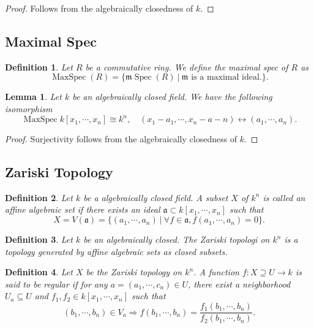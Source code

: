 \documentclass{article}
\newtheorem{definition}{Definition}[section]
\newtheorem{lemma}{Lemma}[section]
\numberwithin{equation}{section}
\DeclareMathOperator{\Spec}{Spec}
\DeclareMathOperator{\MaxSpec}{MaxSpec}
\begin{document}
\begin{proof}
Follows from the algebraically closedness of $k$.%
\end{proof}


\subsection{Maximal Spec}

\begin{definition}
Let $R$ be a commutative ring. We define the maximal spec of $R$ as 
\begin{equation*}
\MaxSpec(R) = \{\mathfrak{m}\Spec(R)\:|\: \mathfrak{m}\text{ is a maximal ideal}.\}.
\end{equation*}
\end{definition}

\begin{lemma}
Let $k$ be an algebraically closed field. We have the following isomorphism
\begin{equation*}
\MaxSpec{k[x_1,\cdots,x_n]}\cong k^n,\quad (x_1-a_1,\cdots,x_n-a-n)\leftrightarrow (a_1,\cdots,a_n).
\end{equation*}
\end{lemma}

\begin{proof}
Surjectivity follows from the algebraically closedness of $k$. %
\end{proof}

\subsection{Zariski Topology}

\begin{definition}
Let $k$ be a algebraically closed field. A subset $X$ of $k^n$ is called an affine algebraic set if there exists an ideal $\mathfrak{a}\subset k[x_1,\cdots,x_n]$ such that
\begin{equation*}
X=V(\mathfrak{a}) = \{(a_1,\cdots,a_n)\:|\: \forall f\in\mathfrak{a}, f(a_1,\cdots,a_n)=0\}.
\end{equation*}
\end{definition}

\begin{definition}
Let $k$ be an algebraically closed. The Zariski topologi on $k^n$ is a topology generated by affine algebraic sets as closed subsets. 
\end{definition}

\begin{definition}
Let $X$ be the Zariski topology on $k^n$. A function $f:X\supseteq U\to k$ is said to be regular if for any $a=(a_1,\cdots,c_n)\in U$, there exist a neighborhood $U_a\subseteq U$ and $f_1,f_2\in k[x_1,\cdots,x_n]$ such that 
\begin{equation*}
(b_1,\cdots,b_n)\in V_a \Rightarrow f(b_1,\cdots,b_n) = {\frac {f_1(b_1,\cdots,b_n)} {f_2(b_1,\cdots,b_n)}}.
\end{equation*}
\end{definition}
\end{document}
